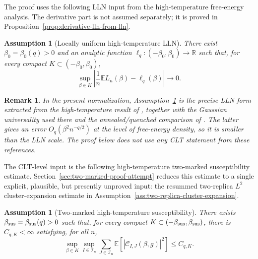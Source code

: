 \documentclass[11pt]{article}
\newtheorem{assumption}[theorem]{Assumption}
\newtheorem{remark}[theorem]{Remark}
\newcommand{\E}{\mathbb{E}}
\newcommand{\R}{\mathbb{R}}
\newcommand{\calI}{\mathcal{I}}
\begin{document}
The proof uses the following LLN input from the high-temperature free-energy
analysis.  The derivative part is not assumed separately; it is proved in
Proposition~\ref{prop:derivative-lln-from-lln}.

\begin{assumption}[Locally uniform high-temperature LLN]\label{ass:local-lln}
  There exist $\beta_0=\beta_0(q)>0$ and an analytic function
  $\ell_q:(-\beta_0,\beta_0)\to\R$ such that, for every compact
  $K\subset(-\beta_0,\beta_0)$,
  \begin{equation}\label{eq:local-lln}
    \sup_{\beta\in K}
    \left|
      \frac1n\E L_n(\beta)-\ell_q(\beta)
    \right|\to0.
  \end{equation}
\end{assumption}

\begin{remark}\label{rem:literature-input}
  In the present normalization, Assumption~\ref{ass:local-lln} is the precise
  LLN form extracted from the high-temperature result of
  \cite{GPSZ2026}, together with the Gaussian universality used there and the
  annealed/quenched comparison of \cite{ACKK2025}.  The latter gives an error
  $O_q(\beta^2n^{-q/2})$ at the level of free-energy density, so it is smaller
  than the LLN scale.  The proof below does not use any CLT statement from
  these references.
\end{remark}

The CLT-level input is the following high-temperature two-marked susceptibility
estimate.  Section~\ref{sec:two-marked-proof-attempt} reduces this estimate to
a single explicit, plausible, but presently unproved input: the resummed
two-replica $L^2$ cluster-expansion estimate in
Assumption~\ref{ass:two-replica-cluster-expansion}.

\begin{assumption}[Two-marked high-temperature susceptibility]
  \label{ass:two-marked-susceptibility}
  There exists $\beta_{\rm sus}=\beta_{\rm sus}(q)>0$ such that, for every
  compact $K\subset(-\beta_{\rm sus},\beta_{\rm sus})$, there is
  $C_{q,K}<\infty$ satisfying, for all $n$,
  \begin{equation}\label{eq:two-marked-susceptibility}
    \sup_{\beta\in K}
    \sup_{I\in\calI_n}
    \sum_{J\in\calI_n}
    \E\left[
      \left|
        \mathcal C_{I,J}(\beta,g)
      \right|^2
    \right]
    \leq
    C_{q,K}.
  \end{equation}
\end{assumption}
\end{document}
